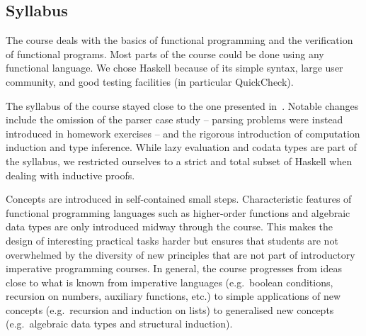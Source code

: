 \subsection{Syllabus}

The course deals with the basics of functional programming and the verification of functional programs.
Most parts of the course could be done using any functional language.
We chose Haskell because of its simple syntax, large user community, and good testing facilities (in particular QuickCheck).

The syllabus of the course stayed close to the one presented in~\citep{next_1100}.
Notable changes include the omission of the parser case study -- parsing problems were instead introduced in homework exercises -- and the rigorous introduction of computation induction and type inference.
While lazy evaluation and codata types are part of the syllabus,
we restricted ourselves to a strict and total subset of Haskell
when dealing with inductive proofs.

Concepts are introduced in self-contained small steps.
Characteristic features of functional programming languages such as
higher-order functions and algebraic data types are
only introduced midway through the course.
This makes the design of interesting practical tasks harder
but ensures that students are not overwhelmed by the diversity
of new principles that are not part of introductory imperative programming courses.
In general, the course progresses from ideas close to what is known from imperative languages (e.g.\ boolean conditions, recursion on numbers, auxiliary functions, etc.)
to simple applications of new concepts (e.g.\ recursion and induction on lists)
to generalised new concepts (e.g.\ algebraic data types and structural induction).

